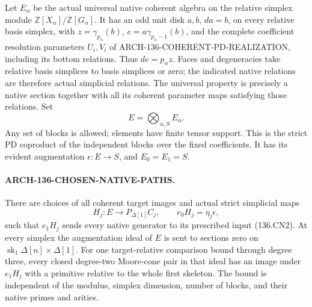 Let \(E_\alpha\) be the actual universal native coherent
algebra on the relative simplex module
\(\mathbb Z[X_\alpha]/\mathbb Z[G_\alpha]\).
It has an odd unit disk \(a,b\), \(da=b\), on every
relative basis simplex, with \(z=\gamma_{p_\alpha}(b)\),
\(e=a\gamma_{p_\alpha-1}(b)\), and the complete coefficient
resolution parameters \(U_i,V_i\) of
ARCH-136-COHERENT-PD-REALIZATION, including its bottom relations.
Thus \(de=p_\alpha z\).  Faces and degeneracies take
relative basis simplices to basis simplices or zero; the indicated
native relations are therefore actual simplicial relations.
The universal property is precisely a native section together
with all its coherent parameter maps satisfying those relations.
Set
\[
                         E=\bigotimes_{\alpha,S}E_\alpha.
                                                               \tag{136.CN4}
\]
Any set of blocks is allowed; elements have finite tensor support.
This is the strict PD coproduct of the independent blocks over
the fixed coefficients.  It has its evident augmentation
\(\epsilon:E\to S\), and \(E_0=E_1=S\).

\paragraph{ARCH-136-CHOSEN-NATIVE-PATHS.}
There are choices of all coherent target images and actual
strict simplicial maps
\[
        H_j:E\longrightarrow P_{\Delta[1]}C_j,
        \qquad e_0H_j=\eta_j\epsilon,                  \tag{136.CN5}
\]
such that \(e_1H_j\) sends every native generator to its
prescribed input (136.CN2).  At every simplex the augmentation
ideal of \(E\) is sent to sections zero on
\(\operatorname{sk}_1\Delta[n]\times\Delta[1]\).
For one target-relative comparison bound through degree three,
every closed degree-two Moore-cone pair in that
ideal has an image under \(e_1H_j\) with a primitive relative
to the whole first skeleton.  The bound is independent of the
modulus, simplex dimension, number of blocks, and their native
primes and arities.

